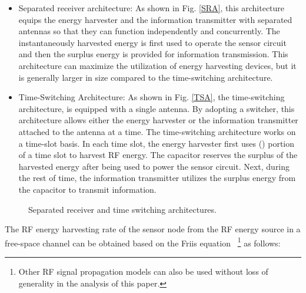\documentclass[12pt,draftclsnofoot,onecolumn]{IEEEtran}
\begin{document}
\begin{itemize}

\item{Separated receiver architecture}: As shown in Fig. \ref{SRA}, this architecture equips the energy harvester and the information transmitter with separated antennas so that they can function independently and concurrently. The instantaneously harvested energy is first used to operate the sensor circuit and then the surplus energy is provided for information transmission. This architecture can maximize the utilization of energy harvesting devices, but it is generally larger in size compared to the time-switching architecture.  


\item{Time-Switching Architecture}: As shown in Fig. \ref{TSA}, the time-switching architecture,  is equipped with a single antenna. By adopting a switcher, this architecture allows either the energy harvester or the information transmitter attached to the antenna at a time. The time-switching architecture works on a time-slot basis. In each time slot, the energy harvester first uses  () portion of a time slot to harvest RF energy. The capacitor reserves the surplus of the harvested energy after being used to power the sensor circuit.  Next, during the rest of  time, the information transmitter utilizes the surplus energy from the capacitor to transmit information.




\end{itemize}





\begin{figure} 
\centering
{}  
 \centering
  \centering
\caption{Separated receiver and time switching architectures.} 
\label{receiver_designs}
\end{figure}



The RF energy harvesting rate of the sensor node from the RF energy source  in a free-space channel  can be obtained based on the Friis equation~\cite{Visser2013} \footnote{Other RF signal propagation models can also be used without loss of generality in the analysis of this paper.} as follows: 
\end{document}
